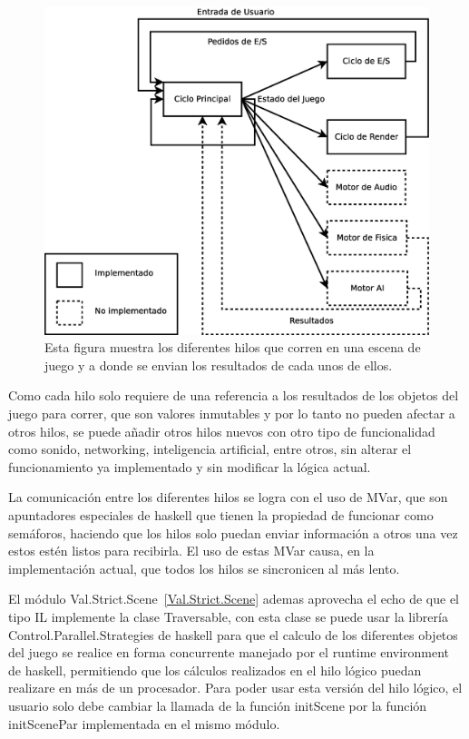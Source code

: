 \begin{figure}[htbp!]
\centering
\includegraphics[width=1.0\textwidth]{ciclo_de_juego}
\caption[Ciclo de juego]{Esta figura muestra los diferentes hilos que corren en una escena de juego y a donde se envian los resultados de cada unos de ellos.}
\label{fig:ciclo_de_juego}
\end{figure}

Como cada hilo solo requiere de una referencia a los resultados de los objetos del juego para correr, que son valores inmutables y por lo tanto no pueden afectar a otros hilos, se puede añadir otros hilos nuevos con otro tipo de funcionalidad como sonido, networking, inteligencia artificial, entre otros, sin alterar el funcionamiento ya implementado y sin modificar la lógica actual.

La comunicación entre los diferentes hilos se logra con el uso de MVar, que son apuntadores especiales de haskell que tienen la propiedad de funcionar como semáforos, haciendo que los hilos solo puedan enviar información a otros una vez estos estén listos para recibirla. El uso de estas MVar causa, en la implementación actual, que todos los hilos se sincronicen al más lento.

El módulo Val.Strict.Scene~\ref{Val.Strict.Scene} ademas aprovecha el echo de que el tipo IL implemente la clase Traversable, con esta clase se puede usar la librería Control.Parallel.Strategies de haskell para que el calculo de los diferentes objetos del juego se realice en forma concurrente manejado por el runtime environment de haskell, permitiendo que los cálculos realizados en el hilo lógico puedan realizare en más de un procesador. Para poder usar esta versión del hilo lógico, el usuario solo debe cambiar la llamada de la función initScene por la función initScenePar implementada en el mismo módulo.

